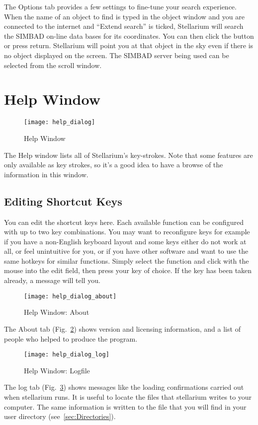 The Options tab provides a few settings to fine-tune your search experience.
When the name of an object to find is typed in the object
window and you are connected to the internet and ``Extend search'' is
ticked, Stellarium will search the SIMBAD on-line  data bases for its
coordinates. You can then click the  button or press return.
Stellarium will point you at that object in the sky even if there is no
object displayed on the screen. The SIMBAD server being used can be
selected from the scroll window.


\section{Help Window}

\begin{figure}[htbp]
\centering\texttt{[image: help\_dialog]}
\caption{Help Window}
\label{fig:gui:help}
\end{figure}

\noindent The Help window lists all of Stellarium's key-strokes. Note that some
features are only available as key strokes, so it's a good idea to have
a browse of the information in this window.

\subsection{Editing Shortcut Keys}
\label{sec:gui:help:hotkeys}

You can edit the shortcut keys here. Each available function can be
configured with up to two key combinations. You may want to
reconfigure keys for example if you have a non-English keyboard layout
and some keys either do not work at all, or feel unintuitive for you,
or if you have other software and want to use the same hotkeys for
similar functions. Simply select the function and click with the mouse
into the edit field, then press your key of choice. If the key has
been taken already, a message will tell you.


\begin{figure}[htbp]
\centering\texttt{[image: help\_dialog\_about]}
\caption{Help Window: About}
\label{fig:gui:help:about}
\end{figure}

The About tab (Fig.~\ref{fig:gui:help:about}) shows version and licensing information, and a list
of people who helped to produce the program.

\begin{figure}[htbp]
\centering\texttt{[image: help\_dialog\_log]}
\caption{Help Window: Logfile}
\label{fig:gui:help:log}
\end{figure}

The log tab (Fig.~\ref{fig:gui:help:log}) shows messages like the loading confirmations carried out when
stellarium runs. It is useful to locate the files that stellarium writes
to your computer. The same information is written to  the file  that you will
find in your user directory (see~\ref{sec:Directories}).




